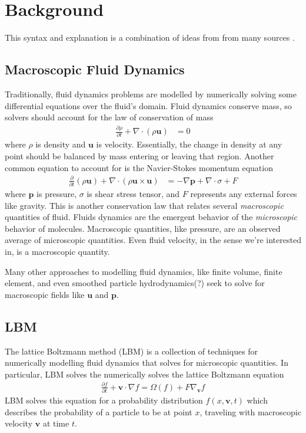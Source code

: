 \section{Background}

This syntax and explanation is a combination of ideas from from many sources \cite{Lyu2021,Li2020,Mei2006,Yu2005,Kruger2018}.

\subsection{Macroscopic Fluid Dynamics}

Traditionally, fluid dynamics problems are 
modelled by numerically solving some 
differential equations over the fluid's domain.
Fluid dynamics conserve mass, so solvers should account for the law of conservation of mass
\begin{align}
  \frac{\partial \rho}{\partial t} + \nabla \cdot (\rho \bm{u}) &= 0
\end{align}
where $\rho$ is density and $\bm{u}$ is velocity. 
Essentially, the change in density at any point should be 
balanced by mass entering or leaving that region.
Another common equation to account for is the Navier-Stokes momentum equation
\begin{align}
\frac{\partial}{\partial t} (\rho \bm{u}) 
+ \nabla \cdot (\rho \bm{u} \times \bm{u}) &= 
- \nabla \bm{p} + \nabla \cdot \sigma + F
\end{align}
where $\bm{p}$ is pressure, $\sigma$ is shear stress tensor, and $F$
represents any external forces like gravity. 
This is another conservation law that relates several \textit{macroscopic}
quantities of fluid.
Fluids dynamics are the emergent behavior of the \textit{microscopic} 
behavior of molecules.
Macroscopic quantities, like pressure, are an observed average of 
microscopic quantities.
Even fluid velocity, in the sense we're interested in, 
is a macroscopic quantity.

Many other approaches to modelling fluid dynamics,
like finite volume, finite element, and even 
smoothed particle hydrodynamics(?)
seek to solve for macroscopic 
fields like $\bm{u}$ and $\bm{p}$.

\subsection{LBM}
The lattice Boltzmann method (LBM) is a collection of techniques for
numerically modelling fluid dynamics that solves for microscopic quantities.
In particular, LBM solves the numerically solves 
the lattice Boltzmann equation
\begin{align}\label{eqn:cont_lbm}
  \frac{\partial f}{\partial t} + \bm{v} \cdot \nabla f = \Omega(f) + F\nabla_{\bm{v}} f
\end{align}
LBM solves this equation for a probability distribution $f(x, \bm{v}, t)$ which
describes the probability of a particle to be at point $x$, traveling with macroscopic velocity $\bm{v}$ at time $t$.

